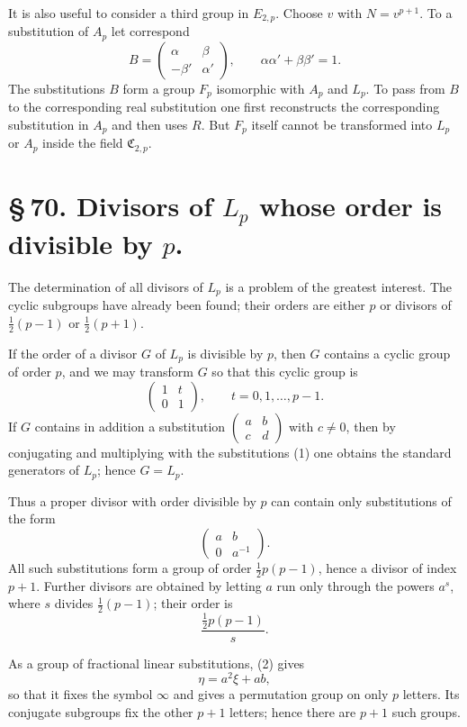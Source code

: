 \documentclass[11pt]{article}
\providecommand{\mat}[4]{\begin{pmatrix}#1&#2\\#3&#4\end{pmatrix}}
\providecommand{\mat}[4]{\begin{pmatrix}#1&#2\\#3&#4\end{pmatrix}}
\providecommand{\Cfield}{\mathfrak C}
\begin{document}
It is also useful to consider a third group in $E_{2,p}$. Choose $v$ with $N=v^{p+1}$. To a substitution of $A_p$ let correspond
\begin{equation}
 B=\mat{\alpha}{\beta}{-\beta'}{\alpha'},
 \qquad \alpha\alpha'+\beta\beta'=1.
 \tag{7}
\end{equation}
The substitutions $B$ form a group $F_p$ isomorphic with $A_p$ and $L_p$. To pass from $B$ to the corresponding real substitution one first reconstructs the corresponding substitution in $A_p$ and then uses $R$. But $F_p$ itself cannot be transformed into $L_p$ or $A_p$ inside the field $\Cfield_{2,p}$.

\section*{\S\,70. Divisors of $L_p$ whose order is divisible by $p$.}

The determination of all divisors of $L_p$ is a problem of the greatest interest. The cyclic subgroups have already been found; their orders are either $p$ or divisors of $\frac12(p-1)$ or $\frac12(p+1)$.

If the order of a divisor $G$ of $L_p$ is divisible by $p$, then $G$ contains a cyclic group of order $p$, and we may transform $G$ so that this cyclic group is
\begin{equation}
 \mat{1}{t}{0}{1},
 \qquad t=0,1,\ldots,p-1.
 \tag{1}
\end{equation}
If $G$ contains in addition a substitution $\mat{a}{b}{c}{d}$ with $c\ne0$, then by conjugating and multiplying with the substitutions (1) one obtains the standard generators of $L_p$; hence $G=L_p$.

Thus a proper divisor with order divisible by $p$ can contain only substitutions of the form
\begin{equation}
 \mat{a}{b}{0}{a^{-1}}.
 \tag{2}
\end{equation}
All such substitutions form a group of order $\frac12p(p-1)$, hence a divisor of index $p+1$. Further divisors are obtained by letting $a$ run only through the powers $a^s$, where $s$ divides $\frac12(p-1)$; their order is
\begin{equation}
 \frac{\frac12p(p-1)}{s}.
 \tag{3}
\end{equation}

As a group of fractional linear substitutions, (2) gives
\[
 \eta=a^2\xi+ab,
\]
so that it fixes the symbol $\infty$ and gives a permutation group on only $p$ letters. Its conjugate subgroups fix the other $p+1$ letters; hence there are $p+1$ such groups.
\end{document}
